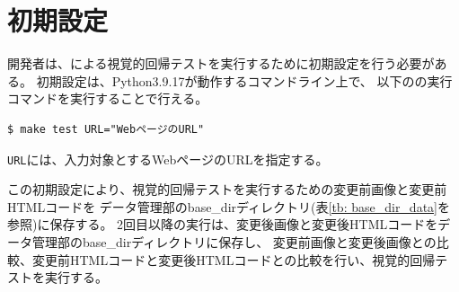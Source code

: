 \section{初期設定}\label{subsec:MixVRT_preparation}
開発者は、\toolName による視覚的回帰テストを実行するために初期設定を行う必要がある。
初期設定は、Python3.9.17\cite{Python}が動作するコマンドライン上で、
以下の\toolName の実行コマンドを実行することで行える。
\begin{lstlisting}[label=list:command,frame=none,numbers=none,basicstyle={\normalsize \ttfamily \color[gray]{.15}}]
  $ make test URL="WebページのURL"
 \end{lstlisting}
{\tt URL}には、入力対象とするWebページのURLを指定する。
\par
この初期設定により、視覚的回帰テストを実行するための変更前画像と変更前HTMLコードを
データ管理部のbase\_dirディレクトリ(表\ref{tb: base_dir_data}を参照)に保存する。
2回目以降の実行は、変更後画像と変更後HTMLコードをデータ管理部のbase\_dirディレクトリに保存し、
変更前画像と変更後画像との比較、変更前HTMLコードと変更後HTMLコードとの比較を行い、視覚的回帰テストを実行する。

